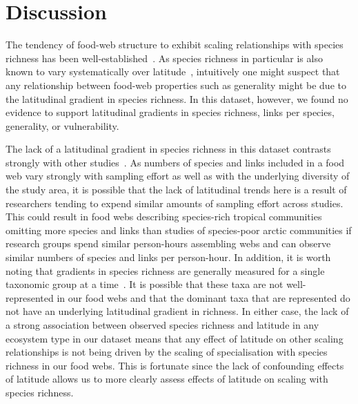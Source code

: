 \documentclass[12pt]{article}
\begin{document}
\section*{Discussion}

  The tendency of food-web structure to exhibit scaling relationships with
  species richness has been well-established~\cite{Dunne2004,Riede2010}. As
  species richness in particular is also known to vary systematically over
  latitude~\cite{Kaufman1995,Macpherson2002,Hillebrand2004,Schemske2009},
  intuitively one might suspect that any relationship between food-web
  properties such as generality might be due to the latitudinal gradient in
  species richness. In this dataset, however, we found no evidence to support
  latitudinal gradients in species richness, links per species, generality, 
  or vulnerability.


  The lack of a latitudinal gradient in species richness in this dataset
  contrasts strongly with other
  studies~\cite{Kaufman1995,Macpherson2002,Hillebrand2004,Schemske2009}. As
  numbers of species and links included in a food web vary strongly with
  sampling effort as well as with the underlying diversity of the study area,
  it is possible that the lack of latitudinal trends here is a result of
  researchers tending to expend similar amounts of sampling effort across
  studies. This could result in food webs describing species-rich tropical
  communities omitting more species and links than studies of species-poor
  arctic communities if research groups spend similar person-hours assembling
  webs and can observe similar numbers of species and links per person-hour.
  In addition, it is worth noting that gradients in species richness are
  generally measured for a single taxonomic group at a
  time~\cite{Kaufman1995,Macpherson2002,Hillebrand2004,Schemske2009}. It is
  possible that these taxa are not well-represented in our food webs and that
  the dominant taxa that are represented do not have an underlying latitudinal
  gradient in richness. In either case, the lack of a strong association
  between observed species richness and latitude in any ecosystem type in our dataset
  means that any effect of latitude on other scaling relationships is not being driven by
  the scaling of specialisation with species richness in our food webs. This is fortunate since
  the lack of confounding effects of latitude allows us to more clearly assess
  effects of latitude on scaling with species richness.
\end{document}
